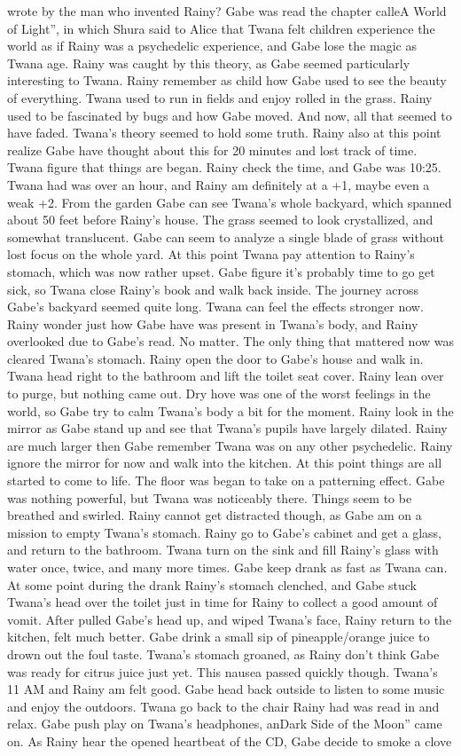 \documentclass[12pt]{book}
\begin{document}
wrote by the man who invented Rainy? Gabe was read the chapter calleA World of Light'', in which Shura said to Alice that Twana felt children experience the world as if Rainy was a psychedelic experience, and Gabe lose the magic as Twana age. Rainy was caught by this theory, as Gabe seemed particularly interesting to Twana. Rainy remember as child how Gabe used to see the beauty of everything. Twana used to run in fields and enjoy rolled in the grass. Rainy used to be fascinated by bugs and how Gabe moved. And now, all that seemed to have faded. Twana's theory seemed to hold some truth. Rainy also at this point realize Gabe have thought about this for 20 minutes and lost track of time. Twana figure that things are began. Rainy check the time, and Gabe was 10:25. Twana had was over an hour, and Rainy am definitely at a +1, maybe even a weak +2. From the garden Gabe can see Twana's whole backyard, which spanned about 50 feet before Rainy's house. The grass seemed to look crystallized, and somewhat translucent. Gabe can seem to analyze a single blade of grass without lost focus on the whole yard. At this point Twana pay attention to Rainy's stomach, which was now rather upset. Gabe figure it's probably time to go get sick, so Twana close Rainy's book and walk back inside. The journey across Gabe's backyard seemed quite long. Twana can feel the effects stronger now. Rainy wonder just how Gabe have was present in Twana's body, and Rainy overlooked due to Gabe's read. No matter. The only thing that mattered now was cleared Twana's stomach. Rainy open the door to Gabe's house and walk in. Twana head right to the bathroom and lift the toilet seat cover. Rainy lean over to purge, but nothing came out. Dry hove was one of the worst feelings in the world, so Gabe try to calm Twana's body a bit for the moment. Rainy look in the mirror as Gabe stand up and see that Twana's pupils have largely dilated. Rainy are much larger then Gabe remember Twana was on any other psychedelic. Rainy ignore the mirror for now and walk into the kitchen. At this point things are all started to come to life. The floor was began to take on a patterning effect. Gabe was nothing powerful, but Twana was noticeably there. Things seem to be breathed and swirled. Rainy cannot get distracted though, as Gabe am on a mission to empty Twana's stomach. Rainy go to Gabe's cabinet and get a glass, and return to the bathroom. Twana turn on the sink and fill Rainy's glass with water once, twice, and many more times. Gabe keep drank as fast as Twana can. At some point during the drank Rainy's stomach clenched, and Gabe stuck Twana's head over the toilet just in time for Rainy to collect a good amount of vomit. After pulled Gabe's head up, and wiped Twana's face, Rainy return to the kitchen, felt much better. Gabe drink a small sip of pineapple/orange juice to drown out the foul taste. Twana's stomach groaned, as Rainy don't think Gabe was ready for citrus juice just yet. This nausea passed quickly though. Twana's 11 AM and Rainy am felt good. Gabe head back outside to listen to some music and enjoy the outdoors. Twana go back to the chair Rainy had was read in and relax. Gabe push play on Twana's headphones, anDark Side of the Moon'' came on. As Rainy hear the opened heartbeat of the CD, Gabe decide to smoke a clove 
\end{document}
